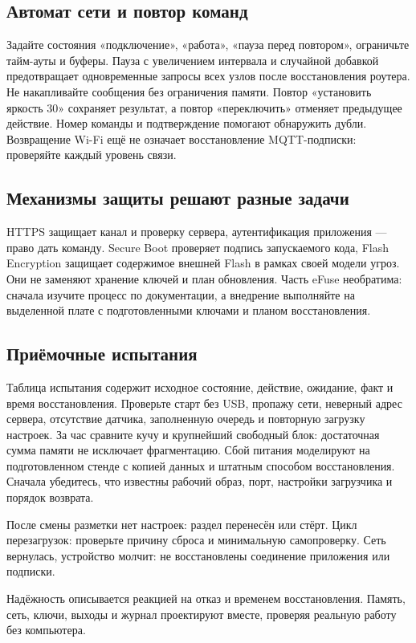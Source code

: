 \subsection{Автомат сети и повтор команд}
Задайте состояния «подключение», «работа», «пауза перед повтором», ограничьте тайм-ауты и буферы.
Пауза с увеличением интервала и случайной добавкой предотвращает одновременные запросы всех узлов
после восстановления роутера. Не накапливайте сообщения без ограничения памяти.
Повтор «установить яркость 30» сохраняет результат, а повтор «переключить» отменяет предыдущее
действие. Номер команды и подтверждение помогают обнаружить дубли.
Возвращение Wi-Fi ещё не означает восстановление MQTT-подписки: проверяйте каждый уровень связи.

\subsection{Механизмы защиты решают разные задачи}
HTTPS защищает канал и проверку сервера, аутентификация приложения --- право дать команду.
Secure Boot проверяет подпись запускаемого кода, Flash Encryption защищает содержимое
внешней Flash в рамках своей модели угроз. Они не заменяют хранение ключей и план обновления.
Часть eFuse необратима: сначала изучите процесс по документации, а внедрение выполняйте
на выделенной плате с подготовленными ключами и планом восстановления.

\subsection{Приёмочные испытания}
Таблица испытания содержит исходное состояние, действие, ожидание, факт и время восстановления.
Проверьте старт без USB, пропажу сети, неверный адрес сервера, отсутствие датчика, заполненную
очередь и повторную загрузку настроек. За час сравните кучу и крупнейший свободный блок:
достаточная сумма памяти не исключает фрагментацию.
Сбой питания моделируют на подготовленном стенде с копией данных и штатным способом восстановления.
Сначала убедитесь, что известны рабочий образ, порт, настройки загрузчика и порядок возврата.

\begin{trouble}
После смены разметки нет настроек: раздел перенесён или стёрт. Цикл перезагрузок:
проверьте причину сброса и минимальную самопроверку. Сеть вернулась, устройство молчит:
не восстановлены соединение приложения или подписки.
\end{trouble}
\begin{summary}
Надёжность описывается реакцией на отказ и временем восстановления. Память, сеть, ключи,
выходы и журнал проектируют вместе, проверяя реальную работу без компьютера.
\end{summary}

